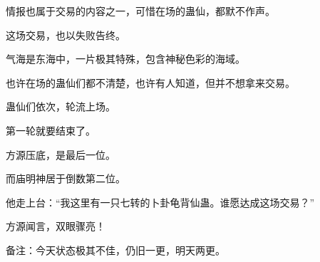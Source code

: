 \begin{this_body}
情报也属于交易的内容之一，可惜在场的蛊仙，都默不作声。

这场交易，也以失败告终。

气海是东海中，一片极其特殊，包含神秘色彩的海域。

也许在场的蛊仙们都不清楚，也许有人知道，但并不想拿来交易。

蛊仙们依次，轮流上场。

第一轮就要结束了。

方源压底，是最后一位。

而庙明神居于倒数第二位。

他走上台：“我这里有一只七转的卜卦龟背仙蛊。谁愿达成这场交易？”

方源闻言，双眼骤亮！

备注：今天状态极其不佳，仍旧一更，明天两更。

\end{this_body}

